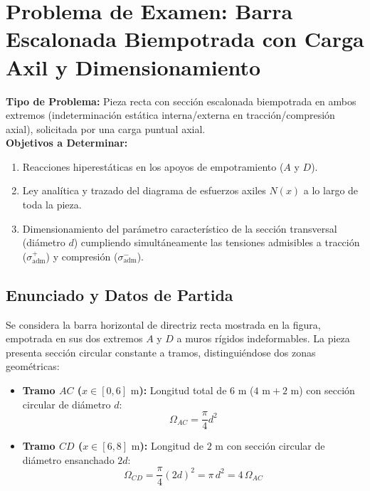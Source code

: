 \section{Problema de Examen: Barra Escalonada Biempotrada con Carga Axil y Dimensionamiento}

\begin{tcolorbox}[colback=white, colframe=myb!80!black, arc=4pt, boxrule=0.9pt, left=8pt, right=8pt, top=7pt, bottom=7pt]
    \textbf{Tipo de Problema:} Pieza recta con sección escalonada biempotrada en ambos extremos (indeterminación estática interna/externa en tracción/compresión axial), solicitada por una carga puntual axial.\\
    \textbf{Objetivos a Determinar:}
    \begin{enumerate}
        \item Reacciones hiperestáticas en los apoyos de empotramiento ($A$ y $D$).
        \item Ley analítica y trazado del diagrama de esfuerzos axiles $N(x)$ a lo largo de toda la pieza.
        \item Dimensionamiento del parámetro característico de la sección transversal (diámetro $d$) cumpliendo simultáneamente las tensiones admisibles a tracción ($\sigma_{\text{adm}}^+$) y compresión ($\sigma_{\text{adm}}^-$).
    \end{enumerate}
\end{tcolorbox}

\subsection{Enunciado y Datos de Partida}

Se considera la barra horizontal de directriz recta mostrada en la figura, empotrada en sus dos extremos $A$ y $D$ a muros rígidos indeformables. La pieza presenta sección circular constante a tramos, distinguiéndose dos zonas geométricas:
\begin{itemize}
    \item \textbf{Tramo $AC$ ($x \in [0, 6]\text{ m}$):} Longitud total de $6\text{ m}$ ($4\text{ m} + 2\text{ m}$) con sección circular de diámetro $d$:
          \begin{equation}
              \Omega_{AC} = \frac{\pi}{4} d^2
          \end{equation}
    \item \textbf{Tramo $CD$ ($x \in [6, 8]\text{ m}$):} Longitud de $2\text{ m}$ con sección circular de diámetro ensanchado $2d$:
          \begin{equation}
              \Omega_{CD} = \frac{\pi}{4} (2d)^2 = \pi\,d^2 = 4\,\Omega_{AC}
          \end{equation}
\end{itemize}

